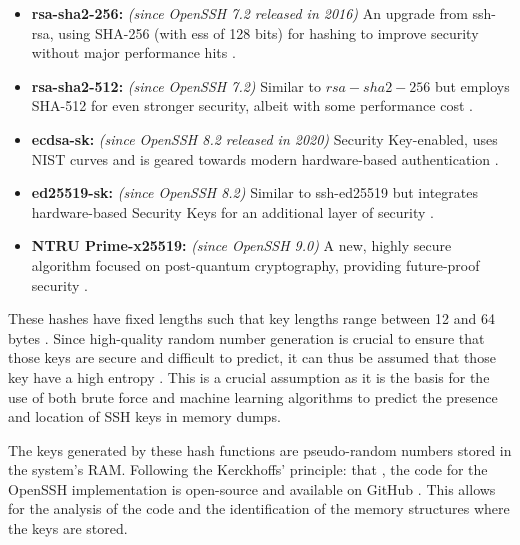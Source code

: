 \begin{itemize}
        \item \textbf{rsa-sha2-256:} \textit{(since OpenSSH 7.2 released in 2016)} An upgrade from ssh-rsa, using SHA-256 (with \acrshort{ess} of 128 bits) for hashing to improve security without major performance hits \cite{OpenSSHReleaseNotes7-2}.
         
        \item \textbf{rsa-sha2-512:} \textit{(since OpenSSH 7.2)} Similar to $rsa-sha2-256$ but employs SHA-512 for even stronger security, albeit with some performance cost \cite{OpenSSHReleaseNotes7-2}.
        
        \item \textbf{ecdsa-sk:} \textit{(since OpenSSH 8.2 released in 2020)} Security Key-enabled, uses NIST curves and is geared towards modern hardware-based authentication \cite{OpenSSHReleaseNotes8-2}.
        
        \item \textbf{ed25519-sk:} \textit{(since OpenSSH 8.2)} Similar to ssh-ed25519 but integrates hardware-based Security Keys for an additional layer of security \cite{OpenSSHReleaseNotes8-2}.
        
        \item \textbf{NTRU Prime-x25519:} \textit{(since OpenSSH 9.0)} A new, highly secure algorithm focused on post-quantum cryptography, providing future-proof security \cite{NTRUPostQuantum17} \cite{OpenSSHReleaseNotes9-0}.
    \end{itemize}
    
    These hashes have fixed lengths such that key lengths range between 12 and 64 bytes \cite{SmartKex22}. Since high-quality random number generation is crucial to ensure that those keys are secure and difficult to predict, it can thus be assumed that those key have a high entropy \cite{McLaren2019}. This is a crucial assumption as it is the basis for the use of both brute force and machine learning algorithms to predict the presence and location of SSH keys in memory dumps.

    The keys generated by these hash functions are pseudo-random numbers stored in the system's RAM. Following the Kerckhoffs' principle: that , the code for the OpenSSH implementation is open-source and available on GitHub \cite{PortableOpenSSHGitHub}. This allows for the analysis of the code and the identification of the memory structures where the keys are stored.

